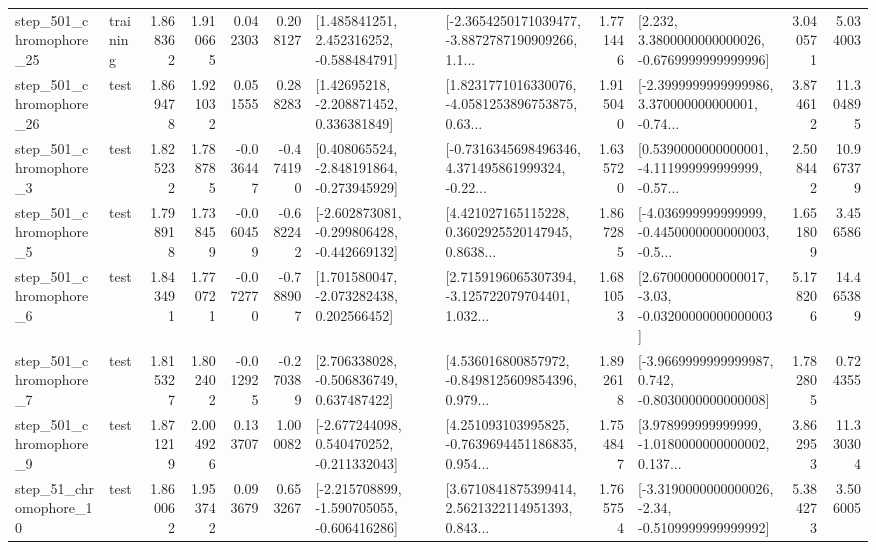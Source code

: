 \begin{tabular}{llrrrrllrlrr}
  step\_501\_chromophore\_25 &  training &      1.868362 &    1.910665 &      0.042303 &  0.208127 &    [1.485841251, 2.452316252, -0.588484791] &  [-2.3654250171039477, -3.8872787190909266, 1.1... &       1.771446 &   [2.232, 3.3800000000000026, -0.6769999999999996] &            3.040571 &          5.034003 \\
  step\_501\_chromophore\_26 &      test &      1.869478 &    1.921032 &      0.051555 &  0.288283 &     [1.42695218, -2.208871452, 0.336381849] &  [1.8231771016330076, -4.0581253896753875, 0.63... &       1.915040 &  [-2.3999999999999986, 3.370000000000001, -0.74... &            3.874612 &         11.304895 \\
   step\_501\_chromophore\_3 &      test &      1.825232 &    1.788785 &     -0.036447 & -0.474190 &   [0.408065524, -2.848191864, -0.273945929] &  [-0.7316345698496346, 4.371495861999324, -0.22... &       1.635720 &  [0.5390000000000001, -4.111999999999999, -0.57... &            2.508442 &         10.967379 \\
   step\_501\_chromophore\_5 &      test &      1.798918 &    1.738459 &     -0.060459 & -0.682242 &  [-2.602873081, -0.299806428, -0.442669132] &  [4.421027165115228, 0.3602925520147945, 0.8638... &       1.867285 &  [-4.036999999999999, -0.4450000000000003, -0.5... &            1.651809 &          3.456586 \\
   step\_501\_chromophore\_6 &      test &      1.843491 &    1.770721 &     -0.072770 & -0.788907 &    [1.701580047, -2.073282438, 0.202566452] &  [2.7159196065307394, -3.125722079704401, 1.032... &       1.681053 &  [2.6700000000000017, -3.03, -0.03200000000000003] &            5.178206 &         14.465389 \\
   step\_501\_chromophore\_7 &      test &      1.815327 &    1.802402 &     -0.012925 & -0.270389 &    [2.706338028, -0.506836749, 0.637487422] &  [4.536016800857972, -0.8498125609854396, 0.979... &       1.892618 &  [-3.9669999999999987, 0.742, -0.8030000000000008] &            1.782805 &          0.724355 \\
   step\_501\_chromophore\_9 &      test &      1.871219 &    2.004926 &      0.133707 &  1.000082 &   [-2.677244098, 0.540470252, -0.211332043] &  [4.251093103995825, -0.7639694451186835, 0.954... &       1.754847 &  [3.978999999999999, -1.0180000000000002, 0.137... &            3.862953 &         11.330304 \\
   step\_51\_chromophore\_10 &      test &      1.860062 &    1.953742 &      0.093679 &  0.653267 &  [-2.215708899, -1.590705055, -0.606416286] &  [3.6710841875399414, 2.5621322114951393, 0.843... &       1.765754 &  [-3.3190000000000026, -2.34, -0.5109999999999992] &            5.384273 &          3.506005 \\

\end{tabular}
